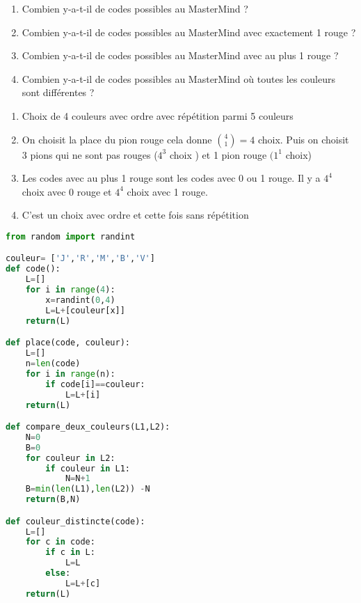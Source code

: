 \documentclass[a4paper, 11pt,reqno]{article}
\begin{document}
\begin{exercice}
\begin{enumerate}
\item Combien y-a-t-il de codes possibles au MasterMind ? 
\item Combien y-a-t-il de codes possibles au MasterMind  avec exactement 1 rouge ? 
\item Combien y-a-t-il de codes possibles au MasterMind avec au plus 1 rouge ? 
\item Combien y-a-t-il de codes possibles au MasterMind  où toutes les couleurs sont différentes ?
\end{enumerate}

\end{exercice}

\begin{correction}
\begin{enumerate}
\item Choix de 4 couleurs avec ordre avec répétition parmi 5 couleurs 
\item On choisit la place du pion rouge cela donne $\binom{4}{1} =4$ choix. Puis on choisit 3 pions qui ne sont pas rouges ($4^3$ choix ) et 1 pion rouge $(1^1$ choix)
\item Les codes avec au plus 1 rouge sont les codes avec 0 ou 1 rouge. 
Il y a $4^4$ choix avec 0 rouge et $4^4$ choix avec 1 rouge. 

\item C'est un choix avec ordre et cette fois sans répétition 
\end{enumerate}

\begin{lstlisting}[language=Python]
from random import randint

couleur= ['J','R','M','B','V']
def code():
    L=[]
    for i in range(4):
        x=randint(0,4)
        L=L+[couleur[x]]
    return(L)

def place(code, couleur):
    L=[]
    n=len(code)
    for i in range(n):
        if code[i]==couleur:
            L=L+[i]
    return(L)

def compare_deux_couleurs(L1,L2):
    N=0
    B=0
    for couleur in L2:
        if couleur in L1:
            N=N+1
    B=min(len(L1),len(L2)) -N
    return(B,N)

def couleur_distincte(code):
    L=[]
    for c in code:
        if c in L:
            L=L
        else:
            L=L+[c]
    return(L)


\end{lstlisting}
\end{correction}
\end{document}
